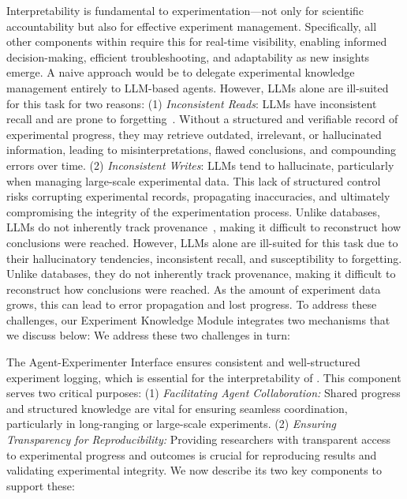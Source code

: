 Interpretability is fundamental to experimentation—not only for scientific accountability but also for effective experiment management. 
Specifically, all other components within \sys require this for real-time visibility, enabling informed decision-making, efficient troubleshooting, and adaptability as new insights emerge. 
A naive approach would be to delegate experimental knowledge management entirely to LLM-based agents. 
However, LLMs alone are ill-suited for this task for two reasons:
(1) \textit{Inconsistent Reads}: LLMs have inconsistent recall and are prone to forgetting~\cite{xu2024knowledge}. Without a structured and verifiable record of experimental progress, they may retrieve outdated, irrelevant, or hallucinated information, leading to misinterpretations, flawed conclusions, and compounding errors over time. 
(2) \textit{Inconsistent Writes}: LLMs tend to hallucinate, particularly when managing large-scale experimental data. This lack of structured control risks corrupting experimental records, propagating inaccuracies, and ultimately compromising the integrity of the experimentation process.  
Unlike databases, LLMs do not inherently track provenance~\cite{hoque2024hallmark}, making it difficult to reconstruct how conclusions were reached.
However, LLMs alone are ill-suited for this task due to their hallucinatory tendencies, inconsistent recall, and susceptibility to forgetting. 
Unlike databases, they do not inherently track provenance, making it difficult to reconstruct how conclusions were reached. 
As the amount of experiment data grows, this can lead to error propagation and lost progress.
To address these challenges, our Experiment Knowledge Module integrates two mechanisms that we discuss below: 
\fi
We address these two challenges in turn: 

The Agent-Experimenter Interface ensures consistent and well-structured experiment logging, which is essential for the interpretability of \sys. This component serves two critical purposes:
(1) \textit{Facilitating Agent Collaboration:} Shared progress and structured knowledge are vital for ensuring seamless coordination, particularly in long-ranging or large-scale experiments.
(2) \textit{Ensuring Transparency for Reproducibility:} Providing researchers with transparent access to experimental progress and outcomes is crucial for reproducing results and validating experimental integrity.
We now describe its two key components to support these:
\fi


